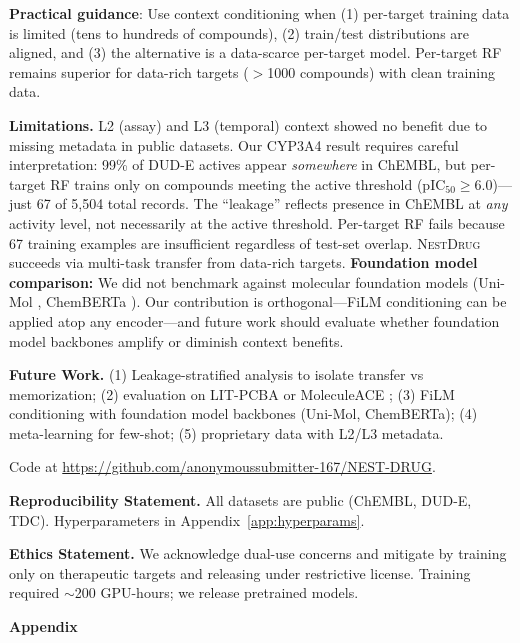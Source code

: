 \documentclass[runningheads]{llncs}
\newcommand{\methodname}{\textsc{NestDrug}}
\begin{document}
\textbf{Practical guidance}: Use context conditioning when (1) per-target training data is limited (tens to hundreds of compounds), (2) train/test distributions are aligned, and (3) the alternative is a data-scarce per-target model. Per-target RF remains superior for data-rich targets ($>$1000 compounds) with clean training data.

\textbf{Limitations.} L2 (assay) and L3 (temporal) context showed no benefit due to missing metadata in public datasets. Our CYP3A4 result requires careful interpretation: 99\% of DUD-E actives appear \textit{somewhere} in ChEMBL, but per-target RF trains only on compounds meeting the active threshold (pIC$_{50} \geq 6.0$)---just 67 of 5,504 total records. The ``leakage'' reflects presence in ChEMBL at \textit{any} activity level, not necessarily at the active threshold. Per-target RF fails because 67 training examples are insufficient regardless of test-set overlap. \methodname{} succeeds via multi-task transfer from data-rich targets. \textbf{Foundation model comparison:} We did not benchmark against molecular foundation models (Uni-Mol \cite{zhou_2023_unimol}, ChemBERTa \cite{chithrananda_2020_chemberta}). Our contribution is orthogonal---FiLM conditioning can be applied atop any encoder---and future work should evaluate whether foundation model backbones amplify or diminish context benefits.

\textbf{Future Work.} (1) Leakage-stratified analysis to isolate transfer vs memorization; (2) evaluation on LIT-PCBA \cite{tran_2020_litpcba} or MoleculeACE \cite{van_tilborg_2024_moleculeace}; (3) FiLM conditioning with foundation model backbones (Uni-Mol, ChemBERTa); (4) meta-learning for few-shot; (5) proprietary data with L2/L3 metadata.

Code at \url{https://github.com/anonymoussubmitter-167/NEST-DRUG}.

\textbf{Reproducibility Statement.}
All datasets are public (ChEMBL, DUD-E, TDC). Hyperparameters in Appendix~\ref{app:hyperparams}.

\textbf{Ethics Statement.}
We acknowledge dual-use concerns and mitigate by training only on therapeutic targets and releasing under restrictive license. Training required $\sim$200 GPU-hours; we release pretrained models.

\FloatBarrier



\clearpage
\appendix

\begin{center}
\Large\textbf{Appendix}
\end{center}
\vspace{1em}
\FloatBarrier
\end{document}
